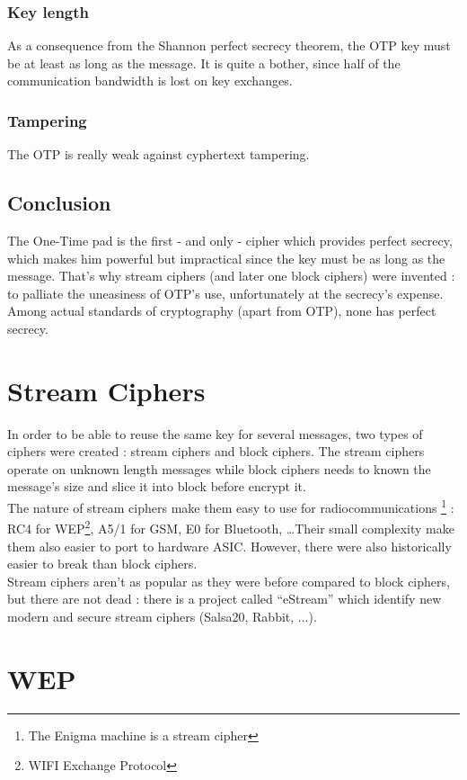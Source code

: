 \subsubsection{Key length}
As a consequence from the Shannon perfect secrecy theorem, the OTP key must be at least as long as the message. It is quite a bother, since half of the communication bandwidth is lost on key exchanges.

\subsubsection{Tampering}
The OTP is really weak against cyphertext tampering.

\subsection{Conclusion}

The One-Time pad is the first - and only - cipher which provides perfect secrecy, which makes him powerful but impractical since the key must be as long as the message. That's why stream ciphers (and later one block ciphers) were invented : to palliate the uneasiness of OTP's use, unfortunately at the secrecy's expense. Among actual standards of cryptography (apart from OTP), none has perfect secrecy. 

\section{ Stream Ciphers }

In order to be able to reuse the same key for several messages, two types of ciphers were created : stream ciphers and block ciphers. The stream ciphers operate on unknown length messages while block ciphers needs to known the message's size and slice it into block before encrypt it.\\
The nature of stream ciphers make them easy to use for radiocommunications \footnote{The Enigma machine is a stream cipher} : RC4 for WEP\footnote{WIFI Exchange Protocol}, A5/1 for GSM, E0 for Bluetooth, \dots Their small complexity make them also easier to port to hardware ASIC. However, there were also historically easier to break than block ciphers.\\
Stream ciphers aren't as popular as they were before compared to block ciphers, but there are not dead : there is a project called ``eStream'' which identify new modern and secure stream ciphers (Salsa20, Rabbit, ...). 

\section{WEP}
\label{sec:WEP}

